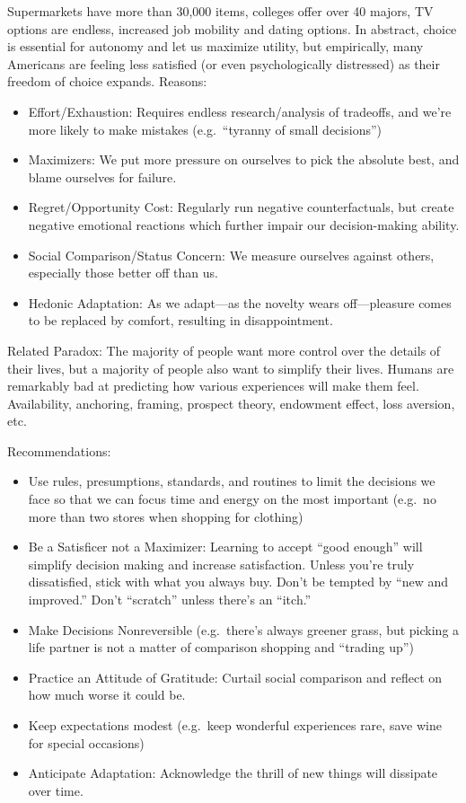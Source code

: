 \documentclass[
]{article}
\begin{document}
Supermarkets have more than 30,000 items, colleges offer over 40 majors,
TV options are endless, increased job mobility and dating options. In
abstract, choice is essential for autonomy and let us maximize utility,
but empirically, many Americans are feeling less satisfied (or even
psychologically distressed) as their freedom of choice expands. Reasons:

\begin{itemize}
\item
  Effort/Exhaustion: Requires endless research/analysis of tradeoffs,
  and we're more likely to make mistakes (e.g.~``tyranny of small
  decisions'')
\item
  Maximizers: We put more pressure on ourselves to pick the absolute
  best, and blame ourselves for failure.
\item
  Regret/Opportunity Cost: Regularly run negative counterfactuals, but
  create negative emotional reactions which further impair our
  decision-making ability.
\item
  Social Comparison/Status Concern: We measure ourselves against others,
  especially those better off than us.
\item
  Hedonic Adaptation: As we adapt---as the novelty wears off---pleasure
  comes to be replaced by comfort, resulting in disappointment.
\end{itemize}

Related Paradox: The majority of people want more control over the
details of their lives, but a majority of people also want to simplify
their lives. Humans are remarkably bad at predicting how various
experiences will make them feel. Availability, anchoring, framing,
prospect theory, endowment effect, loss aversion, etc.

Recommendations:

\begin{itemize}
\item
  Use rules, presumptions, standards, and routines to limit the
  decisions we face so that we can focus time and energy on the most
  important (e.g.~no more than two stores when shopping for clothing)
\item
  Be a Satisficer not a Maximizer: Learning to accept ``good enough''
  will simplify decision making and increase satisfaction. Unless you're
  truly dissatisfied, stick with what you always buy. Don't be tempted
  by ``new and improved.'' Don't ``scratch'' unless there's an ``itch.''
\item
  Make Decisions Nonreversible (e.g.~there's always greener grass, but
  picking a life partner is not a matter of comparison shopping and
  ``trading up'')
\item
  Practice an Attitude of Gratitude: Curtail social comparison and
  reflect on how much worse it could be.
\item
  Keep expectations modest (e.g.~keep wonderful experiences rare, save
  wine for special occasions)
\item
  Anticipate Adaptation: Acknowledge the thrill of new things will
  dissipate over time.
\end{itemize}
\end{document}
